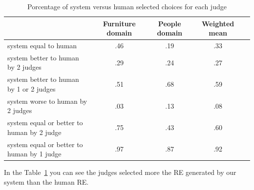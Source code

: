 \begin{table}[h!]
\begin{center}
\begin{tabular}{|l|c|c|c|c|}
\hline
 & Furniture domain & People domain & Weighted mean \\
\hline
system equal to human  	&	.46	&	.19	&	.33 \\
system better to human by 2 judges &	.29 	& 	.24 	& 	.27 \\
system better to human by 1 or 2 judges & .51	&	.68	&	.59 \\
system worse to human by 2 judges &	.03	&	.13	&	.08 \\
system equal or better to human by 2 judge  &.75  &       .43	&       .60 \\
system equal or better to human by 1 judge  &.97	&	.87	&	.92 \\
\hline
\end{tabular}
\caption{Porcentage of system versus human selected choices for each judge} 
\label{system-versus-human}
\end{center}
\end{table}
In the Table~\ref{system-versus-human} you can see the judges selected more the RE generated by our system than the human RE.



